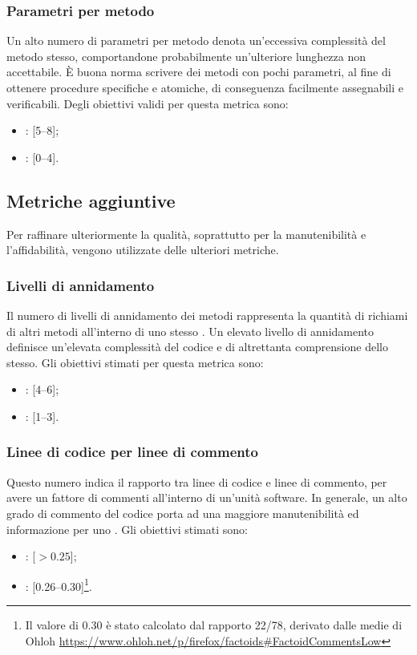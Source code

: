 \subsubsection{Parametri per metodo}
Un alto numero di parametri per metodo denota un'eccessiva complessità del metodo stesso, comportandone probabilmente un'ulteriore lunghezza non accettabile. \`{E} buona norma scrivere dei metodi con pochi parametri, al fine di ottenere procedure specifiche e atomiche, di conseguenza facilmente assegnabili e verificabili.
Degli obiettivi validi per questa metrica sono:
\begin{itemize}
\item {}: [5--8];
\item {}: [0--4].
\end{itemize}

\subsection{Metriche aggiuntive}
Per raffinare ulteriormente la qualità, soprattutto per la manutenibilità e l'affidabilità, vengono utilizzate delle ulteriori metriche.

\subsubsection{Livelli di annidamento}
\label{4.2.2}
Il numero di livelli di annidamento dei metodi rappresenta la quantità di richiami di altri metodi all'interno di uno stesso .
Un elevato livello di annidamento definisce un'elevata complessità del codice e di altrettanta comprensione dello stesso.
Gli obiettivi stimati per questa metrica sono:
\begin{itemize}
\item {}: [4--6];
\item {}: [1--3].
\end{itemize}

\subsubsection{Linee di codice per linee di commento}
\label{4.2.5}
Questo numero indica il rapporto tra linee di codice e linee di commento, per avere un fattore di commenti all'interno di un'unità software. In generale, un alto grado di commento del codice porta ad una maggiore manutenibilità ed informazione per uno .
Gli obiettivi stimati sono:
\begin{itemize}
\item {}: [$>0.25$];
\item {}: [0.26--0.30]\footnote{Il valore di 0.30 è stato calcolato dal rapporto 22/78, derivato dalle medie di Ohloh \url{https://www.ohloh.net/p/firefox/factoids\#FactoidCommentsLow}}.
\end{itemize}

